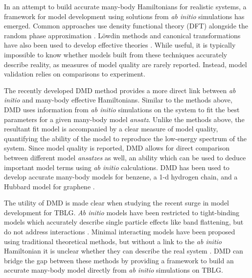 \documentclass[12pt]{article}
\begin{document}
In an attempt to build accurate many-body Hamiltonians for realistic systems, a framework for model development using solutions from \textit{ab initio} simulations has emerged.
Common approaches use density functional theory (DFT) \cite{PhysRev.140.A1133, PhysRevLett.87.047003} alongside the random phase approximation \cite{PhysRevB.62.R16219, PhysRevB.70.195104, PhysRevB.88.075106}.
L\"owdin methods and canonical transformations have also been used to develop effective theories \cite{doi:10.1063/1.4802766, PhysRevA.81.013402, doi:10.1063/1.2196410}.
While useful, it is typically impossible to know whether models built from these techniques accurately describe reality, as measures of model quality are rarely reported.
Instead, model validation relies on comparisons to experiment.

The recently developed DMD \cite{Zheng2017} method provides a more direct link between \textit{ab initio} and many-body effective Hamiltonians.
Similar to the methods above, DMD uses information from \textit{ab initio} simulations on the system to fit the best parameters for a given many-body model \textit{ansatz}.
Unlike the methods above, the resultant fit model is accompanied by a clear measure of model quality, quantifying the ability of the model to reproduce the low-energy spectrum of the system.
Since model quality is reported, DMD allows for direct comparison between different model \textit{ansatzes} as well, an ability which can be used to deduce important model terms using \textit{ab initio} calculations.
DMD has been used to develop accurate many-body models for benzene, a 1-d hydrogen chain, and a Hubbard model for graphene \cite{Zheng2017, Wagner2015}.

The utility of DMD is made clear when studying the recent surge in model development for TBLG.
\textit{Ab initio} models have been restricted to tight-binding models which accurately describe single particle effects like band flattening, but do not address interactions \cite{Fang, PhysRevX.8.031087}.
Minimal interacting models have been proposed using traditional theoretical methods, but without a link to the \textit{ab initio} Hamiltonian it is unclear whether they can describe the real system \cite{PhysRevB.98.045103, PhysRevB.100.125116}.
DMD can bridge the gap between these methods by providing a framework to build an accurate many-body model directly from \textit{ab initio} simulations on TBLG.
\end{document}

